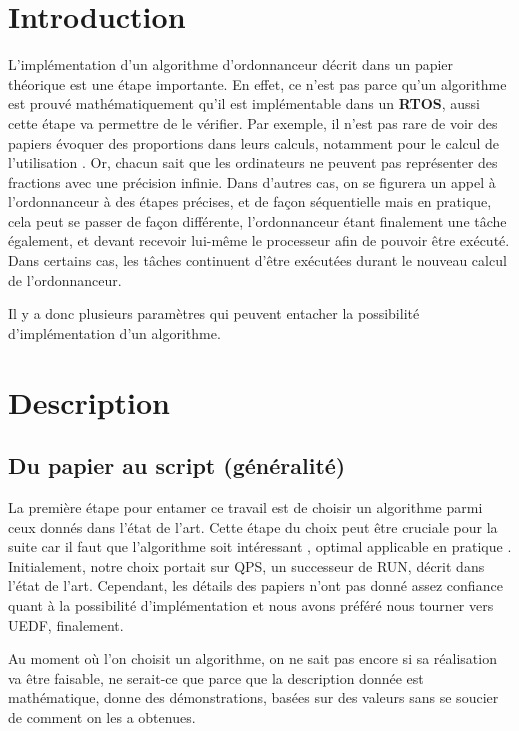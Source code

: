 \section{Introduction}

L'implémentation d'un algorithme d'ordonnanceur décrit dans un papier théorique 
est une étape importante. 
En effet, ce n'est pas parce qu'un algorithme est prouvé mathématiquement 
qu'il est implémentable dans un \textbf{RTOS}, aussi cette étape va permettre de le vérifier.
Par exemple, il n'est pas rare de voir des papiers évoquer des proportions 
dans leurs calculs, notamment pour le calcul de l'utilisation .
Or, chacun sait que les ordinateurs ne peuvent 
pas représenter des fractions avec une précision infinie.
Dans d'autres cas, on se figurera un appel à l'ordonnanceur à des étapes 
précises, et de façon séquentielle mais en pratique, cela peut se passer de façon différente, 
l'ordonnanceur étant finalement une tâche également, et devant recevoir 
lui-même le processeur afin de pouvoir être exécuté. 
Dans certains cas, les tâches continuent d'être exécutées durant le nouveau 
calcul de l'ordonnanceur.

Il y a donc plusieurs paramètres qui peuvent entacher la possibilité d'implémentation 
d'un algorithme.




\section{Description}
	\subsection{Du papier au script (généralité)}
	La première étape pour entamer ce travail est de choisir un algorithme parmi ceux donnés dans l'état de l'art.
	Cette étape du choix peut être cruciale pour la suite car il faut que l'algorithme soit 
	intéressant ,
	optimal 
	applicable en pratique .
	Initialement, notre choix portait sur QPS, un 
	successeur de RUN, décrit dans l'état de l'art. Cependant, les détails des papiers n'ont pas donné 
	assez confiance quant à la possibilité d'implémentation et nous avons préféré nous tourner vers UEDF, finalement.
	
	
	Au moment où l'on choisit un algorithme, on ne sait pas encore si sa réalisation va être faisable, 
	ne serait-ce que parce que la description donnée est mathématique, donne des démonstrations, 
	basées sur des valeurs sans se soucier de comment on les a obtenues.
	
